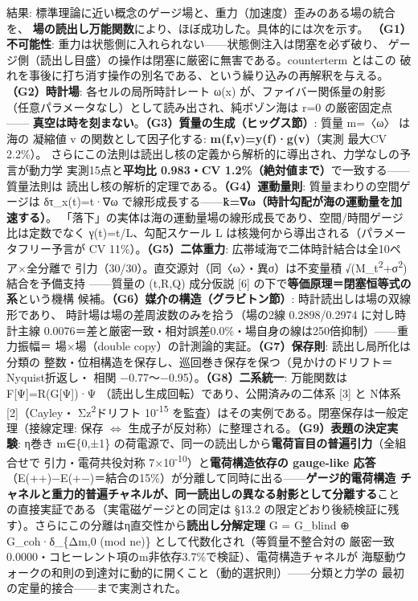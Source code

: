 \documentclass[
]{ltjarticle}
\begin{document}
結果:
標準理論に近い概念のゲージ場と、重力（加速度）歪みのある場の統合を、
\textbf{場の読出し万能関数}により、ほぼ成功した。具体的には次を示す。
\textbf{（G1）不可能性}:
重力は状態側に入れられない------状態側注入は閉塞を必ず破り、
ゲージ側（読出し目盛）の操作は閉塞に厳密に無害である。counterterm
とはこの
破れを事後に打ち消す操作の別名である、という繰り込みの再解釈を与える。
\textbf{（G2）時計場}: 各セルの局所時計レート ω(x)
が、ファイバー関係量の射影
（任意パラメータなし）として読み出され、純ボゾン海は r=0
の厳密固定点------
\textbf{真空は時を刻まない}。\textbf{（G3）質量の生成（ヒッグス節）}:
質量 m=〈ω〉 は海の 凝縮値 v の関数として因子化する:
\textbf{m(f,v)=y(f)·g(v)}（実測 最大CV 2.2\%）。
さらにこの法則は読出し核の定義から解析的に導出され、力学なしの予言が動力学
実測15点と\textbf{平均比 0.983・CV
1.2\%（絶対値まで）}で一致する------質量法則は
読出し核の解析的定理である。\textbf{（G4）運動量則}:
質量まわりの空間ゲージは δτ\_x(t)=t·∇ω
で線形成長する------\textbf{k̇=∇ω（時計勾配が海の運動量を加速する）}。
「落下」の実体は海の運動量場の線形成長であり、空間/時間ゲージ比は定数でなく
γ(t)=t/L、勾配スケール L は核幾何から導出される（パラメータフリー予言が
CV 11\%）。\textbf{（G5）二体重力}:
広帯域海で二体時計結合は全10ペア×全分離で
引力（30/30）。直交源対（同〈ω〉・異σ）は不変量積
√(M\_t\textsuperscript{2}+σ\textsuperscript{2}) 結合を予備支持
------質量の (t,R,Q) 成分仮説 {[}6{]}
の下で\textbf{等価原理＝閉塞恒等式の系}という機構
候補。\textbf{（G6）媒介の構造（グラビトン節）}:
時計読出しは場の双線形であり、 時計場は場の差周波数のみを拾う（場の2線
0.2898/0.2974 に対し時計主線
0.0076＝差と厳密一致・相対誤差0.0\%・場自身の線は250倍抑制）------重力振幅＝
場×場（double copy）の計測論的実証。\textbf{（G7）保存則}:
読出し局所化は分類の
整数・位相構造を保存し、巡回巻き保存を保つ（見かけのドリフト＝Nyquist折返し・
相関 −0.77〜−0.95）。\textbf{（G8）二系統一}: 万能関数は
F{[}Ψ{]}=R(G{[}Ψ{]})·Ψ （読出し生成回転）であり、公開済みの二体系
{[}3{]} と N体系 {[}2{]}（Cayley・ Σz\textsuperscript{2}ドリフト
10\textsuperscript{-15}
を監査）はその実例である。閉塞保存は一般定理（接線定理: 保存
\(\Leftrightarrow\)
生成子が反対称）に整理される。\textbf{（G9）表題の決定実験}: η巻き
m∈\{0,±1\}
の荷電源で、同一の読出しから\textbf{電荷盲目の普遍引力}（全組合せで
引力・電荷共役対称 7×10\textsuperscript{-10}）と\textbf{電荷構造依存の
gauge-like 応答}
（E(++)−E(+−)＝結合の15\%）が分離して同時に出る------\textbf{ゲージ的電荷構造
チャネルと重力的普遍チャネルが、同一読出しの異なる射影として分離する}こと
の直接実証である（実電磁ゲージとの同定は §13.2
の限定どおり後続検証に残す）。さらにこの分離はη直交性から\textbf{読出し分解定理}
G = G\_blind ⊕ G\_coh·δ\_\{Δm,0 (mod ne)\}
として代数化され（等質量不整合対の
厳密一致0.0000・コヒーレント項の\textbar m\textbar 非依存3.7\%で検証）、電荷構造チャネルが
海駆動ウォークの和則の到達対に動的に開くこと（動的選択則）------分類と力学の
最初の定量的接合------まで実測された。
\end{document}
